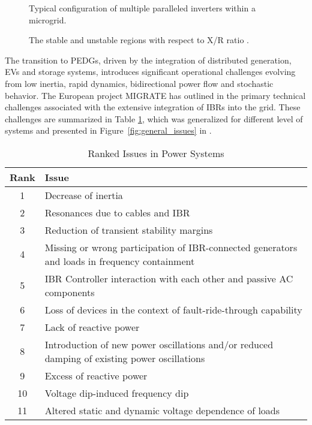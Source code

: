 \begin{figure}[ht]
    \caption{Typical configuration of multiple paralleled inverters within a microgrid.}\label{fig:multi_parallel}
\end{figure}

\begin{figure}[ht]
    \caption{The stable and unstable regions with respect to X/R ratio \cite{8242351}.}\label{fig:stability_regions}
\end{figure}

The transition to PEDGs, driven by the integration of distributed generation, EVs and storage systems, introduces significant operational challenges evolving from low inertia, rapid dynamics, bidirectional power flow and stochastic behavior. The European project MIGRATE has outlined in \autocite{MIGRATE2016} the primary technical challenges associated with the extensive integration of IBRs into the grid. These challenges are summarized in Table \ref{tab:power_system_issues}, which was generalized for different level of systems and presented in Figure~\cref{fig:general_issues}  in \autocite{8809097}.

\begin{table} [htbp]
    \centering
    \begin{threeparttable}%
        \caption{Ranked Issues in Power Systems}\label{tab:power_system_issues}%
        \begin{tabular}{| c || p{13cm} |}
            \hline
            \hline
                \textbf{Rank} & \textbf{Issue} \\ \hline
                1 & Decrease of inertia \\ \hline
                2 & Resonances due to cables and IBR \\ \hline
                3 & Reduction of transient stability margins \\ \hline
                4 & Missing or wrong participation of IBR-connected generators and loads in frequency containment \\ \hline
                5 & IBR Controller interaction with each other and passive AC components \\ \hline
                6 & Loss of devices in the context of fault-ride-through capability \\ \hline
                7 & Lack of reactive power \\ \hline
                8 & Introduction of new power oscillations and/or reduced damping of existing power oscillations \\ \hline
                9 & Excess of reactive power \\ \hline
                10 & Voltage dip-induced frequency dip \\ \hline
                11 & Altered static and dynamic voltage dependence of loads \\ \hline
            \hline
        \end{tabular}
    \end{threeparttable}
\end{table}

